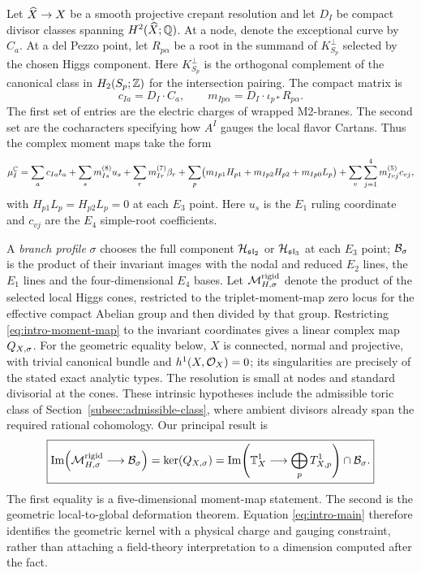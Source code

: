 Let $\widehat X\to X$ be a smooth projective crepant resolution and let $D_I$
be compact divisor classes spanning $H^2(\widehat X;\mathbb Q)$. At a node, denote
the exceptional curve by $C_a$. At a del Pezzo point, let $R_{p\alpha}$ be a root in the summand of
$K_{S_p}^{\perp}$ selected by the chosen Higgs component. Here
$K_{S_p}^{\perp}$ is the orthogonal complement of the canonical class in
$H_2(S_p;\mathbb Z)$ for the intersection pairing. The compact matrix is
\begin{equation}
 c_{Ia}=D_I\cdot C_a,
 \qquad
 m_{Ip\alpha}=D_I\cdot\iota_{p*}R_{p\alpha}.
 \label{eq:intro-charges}
\end{equation}
The first set of entries are the electric charges of wrapped M2-branes. The
second set are the cocharacters specifying how $A^I$ gauges the local flavor
Cartans. Thus the complex moment maps take the form
\begin{equation}
 \mu_I^{\mathbb C}
 =\sum_a c_{Ia}t_a+\sum_s m^{(8)}_{Is}u_s
  +\sum_r m^{(7)}_{Ir}\beta_r
  +\sum_p\bigl(m_{Ip1}H_{p1}+m_{Ip2}H_{p2}+m_{Ip0}L_p\bigr)
  +\sum_v\sum_{j=1}^4m^{(5)}_{Ivj}c_{vj},
 \label{eq:intro-moment-map}
\end{equation}
with $H_{p1}L_p=H_{p2}L_p=0$ at each $E_3$ point. Here $u_s$ is the
$E_1$ ruling coordinate and $c_{vj}$ are the $E_4$ simple-root coefficients.

A \emph{branch profile} $\sigma$ chooses the full component
$\mathcal H_{\mathfrak{sl}_2}$ or $\mathcal H_{\mathfrak{sl}_3}$ at each $E_3$ point;
$\mathcal B_{\sigma}$ is the product of their invariant images with the nodal and
reduced $E_2$ lines, the $E_1$ lines and the four-dimensional $E_4$ bases.
Let $\mathcal M_{H,\sigma}^{\mathrm{rigid}}$ denote the product
of the selected local Higgs cones, restricted to the triplet-moment-map zero locus
for the effective compact Abelian group and then divided by that group.
Restricting \eqref{eq:intro-moment-map} to the invariant coordinates gives a
linear complex map $Q_{X,\sigma}$. For the geometric equality below, $X$ is
connected, normal and projective, with trivial canonical bundle and
$h^1(X,\mathcal O_X)=0$; its singularities are precisely of the stated exact
analytic types. The resolution is small at nodes and standard divisorial
at the cones. These intrinsic hypotheses include the admissible toric
class of Section~\ref{subsec:admissible-class}, where ambient divisors
already span the required rational cohomology. Our principal result is
\begin{equation}
 \boxed{
 \operatorname{Im}\!\left(
   \mathcal M_{H,\sigma}^{\mathrm{rigid}}\longrightarrow\mathcal B_{\sigma}
 \right)
 =\ker(Q_{X,\sigma})
 =\operatorname{Im}\!\left(
   \mathbb T^1_X\longrightarrow\bigoplus_pT^1_{X,p}
 \right)\cap\mathcal B_{\sigma}.}
 \label{eq:intro-main}
\end{equation}
The first equality is a five-dimensional moment-map statement. The second is
the geometric local-to-global deformation theorem. Equation
\eqref{eq:intro-main} therefore identifies the geometric kernel with a physical
charge and gauging constraint, rather than attaching a field-theory
interpretation to a dimension computed after the fact.

